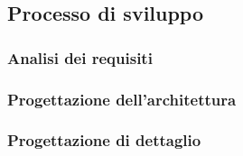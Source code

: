 \subsection{Processo di sviluppo}
\subsubsection{Analisi dei requisiti}
\subsubsection{Progettazione dell'architettura}
\subsubsection{Progettazione di dettaglio}
